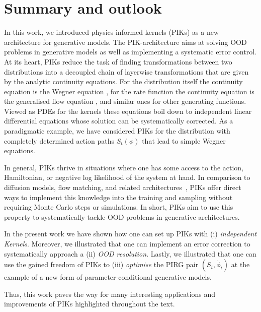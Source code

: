 \documentclass[reprint,amsmath,amssymb,aps,pra,superscriptaddress,nofootinbib,twocolumn,floatfix,nolongbibliography]{revtex4-2}
\begin{document}
\section{Summary and outlook}
\label{sec:Outlook}

In this work, we introduced physics-informed kernels (PIKs) as a new architecture for generative models. The PIK-architecture aims at solving OOD problems in generative models as well as implementing a systematic error control. At its heart, PIKs reduce the task of finding transformations between two distributions into a decoupled chain of layerwise transformations that are given by the analytic continuity equations. For the distribution itself the continuity equation is the Wegner equation , for the rate function the continuity equation is the generalised flow equation , and similar ones for other generating functions. Viewed as PDEs for the kernels these equations boil down to independent linear differential equations whose solution can be systematically corrected. As a paradigmatic example, we have considered PIKs for the distribution with completely determined action paths $S_t(\phi)$ that lead to simple Wegner equations. 

In general, PIKs thrive in situations where one has some access to the action, Hamiltonian, or negative log likelihood of the system at hand. In comparison to diffusion models, flow matching, and related architectures~\cite{Rezende:2016vinf,Dinh:2017nfd,Albergo:2019eim,Nicoli:2020njz,Ho:2020ddpm,Song:2021sbgm,Wang:2023exq,Lipman:2023fmgm,Xu:2024jko,Masuki:2025irg}, PIKs offer direct ways to implement this knowledge into the training and sampling without requiring Monte Carlo steps or simulations. In short, PIKs aim to use this property to systematically tackle OOD problems in generative architectures.  

In the present work we have shown how one can set up PIKs with (i) \textit{independent Kernels}. Moreover, we illustrated that one can implement an error correction to systematically approach a (ii) \textit{OOD resolution}. Lastly, we illustrated that one can use the gained freedom of PIKs to (iii) \textit{optimise} the PIRG pair $(S_t, \dot{\phi}_t)$ at the example of a new form of parameter-conditional generative models. 

Thus, this work paves the way for many interesting applications and improvements of PIKs highlighted throughout the text. 
\end{document}

